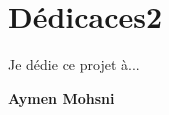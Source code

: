 
\chapter*{Dédicaces2 }

\begin{center}

	\begin{minipage}[c]{1\columnwidth}

		{\large
			\vskip1cm

			\centering
			Je dédie ce projet à...
		}


	\end{minipage}

\end{center}

\vskip1.5cm
\begin{flushright}\LARGE
	\bf{Aymen Mohsni}
\end{flushright}







